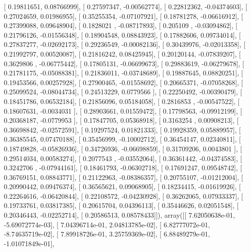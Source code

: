 \documentclass{article}
\begin{document}
       [ 0.19811651,  0.08766999],
       [ 0.27597347, -0.00562774],
       [ 0.22812362, -0.04374603],
       [ 0.27024659,  0.01986955],
       [ 0.35255354, -0.07107921],
       [ 0.18781278, -0.06616912],
       [ 0.27399088,  0.09648904],
       [ 0.1828021 , -0.08717893],
       [ 0.205109  , -0.03094862],
       [ 0.21796126, -0.01556348],
       [ 0.18904548,  0.08843923],
       [ 0.17882606,  0.09734014],
       [ 0.27837277, -0.02692173],
       [ 0.29236549, -0.00082136],
       [ 0.30439976, -0.02013358],
       [ 0.21992797,  0.00520087],
       [ 0.21816242,  0.08425945],
       [ 0.20120144, -0.07839207],
       [ 0.3629806 , -0.06775442],
       [ 0.17805131, -0.06699673],
       [ 0.29883619, -0.06279678],
       [ 0.21781175, -0.05088381],
       [ 0.21836011, -0.03748689],
       [ 0.19887645,  0.08820251],
       [ 0.19453566,  0.00257928],
       [ 0.27900465, -0.01558692],
       [ 0.20665371, -0.07058268],
       [ 0.25099524, -0.08044734],
       [ 0.24513229,  0.0779566 ],
       [ 0.22250492, -0.00390479],
       [ 0.18451786,  0.06532184],
       [ 0.21856096,  0.05184058],
       [ 0.2816853 , -0.00547522],
       [ 0.18607631, -0.0034031 ],
       [ 0.28903661,  0.01559472],
       [ 0.17798563, -0.09912199],
       [ 0.20368187, -0.0779953 ],
       [ 0.17847705,  0.05368918],
       [ 0.3163254 ,  0.00908213],
       [ 0.36698842, -0.02572591],
       [ 0.19297524,  0.01821333],
       [ 0.19928359,  0.05889957],
       [ 0.36385545,  0.07470188],
       [ 0.35456999, -0.10002712],
       [ 0.36454147,  0.02340811],
       [ 0.18749828, -0.05826936],
       [ 0.34726936, -0.06698859],
       [ 0.31709206,  0.0043801 ],
       [ 0.29514034,  0.00583274],
       [ 0.2077543 , -0.03552064],
       [ 0.36361442, -0.04374583],
       [ 0.3242706 , -0.07944161],
       [ 0.18461793, -0.06302718],
       [ 0.17691247,  0.09548742],
       [ 0.36769151,  0.08843771],
       [ 0.21122963, -0.08386357],
       [ 0.20755107, -0.01212004],
       [ 0.20990442,  0.09476374],
       [ 0.36565621,  0.09068905],
       [ 0.18234415, -0.01619926],
       [ 0.22264616, -0.06420844],
       [ 0.22108572, -0.04230928],
       [ 0.36262065,  0.07933337],
       [ 0.19733761,  0.03817385],
       [ 0.20615704,  0.04396113],
       [ 0.35446626,  0.02051548],
       [ 0.20346443, -0.02252714],
       [ 0.20586513,  0.08578433]]), array([[  7.62050638e-01,  -5.69072774e-03],
       [  7.04396714e-01,   2.04813785e-02],
       [  6.82777072e-01,  -8.74635719e-02],
       [  7.89918726e-01,   3.25759369e-02],
       [  6.88489279e-01,  -1.01071849e-01],
\end{document}
